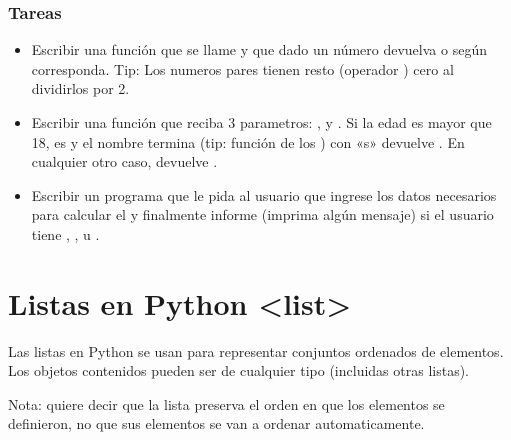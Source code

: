 \documentclass[a4paper,12pt,spanish]{sphinxmanual}
\begin{document}
\subsection{Tareas}
\label{\detokenize{bool:tareas}}\begin{itemize}
\item {} 
\sphinxAtStartPar
Escribir una función que se llame  y que dado un número devuelva
 o  según corresponda. Tip: Los numeros pares tienen resto (operador \sphinxcode{\sphinxupquote{\%}})
cero al dividirlos por 2.

\item {} 
\sphinxAtStartPar
Escribir una función que reciba 3 parametros: ,  y .
Si la edad es mayor que 18,  es  y el nombre termina (tip:
función  de los ) con «s» devuelve . En cualquier otro caso,
devuelve .

\item {} 
\sphinxAtStartPar
Escribir un programa que le pida al usuario que ingrese los datos
necesarios para calcular el
y finalmente informe (imprima algún mensaje) si el usuario tiene , ,
 u .

\end{itemize}

\sphinxstepscope


\chapter{Listas en Python \textless{}list\textgreater{}}
\label{\detokenize{list:listas-en-python-list}}\label{\detokenize{list::doc}}
\sphinxAtStartPar
Las listas en Python se usan para representar conjuntos ordenados de elementos.
Los objetos contenidos pueden ser de cualquier tipo (incluidas otras listas).

\sphinxAtStartPar
Nota:  quiere decir que la lista preserva el orden en que los elementos se
definieron, no que sus elementos se van a ordenar automaticamente.
\end{document}

